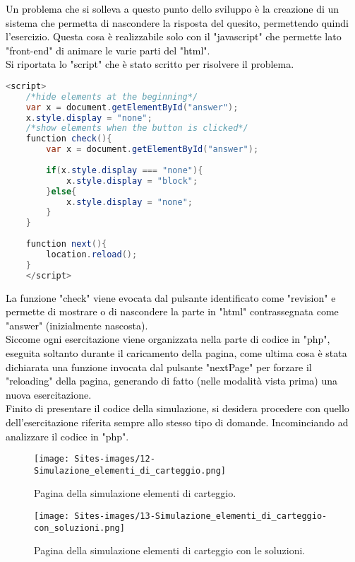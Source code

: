 \textcolor{black}{Un problema che si solleva a questo punto dello sviluppo è la creazione di un sistema che permetta di nascondere la risposta del quesito, permettendo quindi l'esercizio. Questa cosa è realizzabile solo con il "javascript" che permette lato "front-end" di animare le varie parti del "html".\\
Si riportata lo "script" che è stato scritto per risolvere il problema.}\\

\begin{lstlisting}[language=java]
	<script>
	/*hide elements at the beginning*/
	var x = document.getElementById("answer");
	x.style.display = "none";
	/*show elements when the button is clicked*/
	function check(){
		var x = document.getElementById("answer");
		
		if(x.style.display === "none"){
			x.style.display = "block";
		}else{
			x.style.display = "none";
		}	
	}
	
	function next(){
		location.reload();  
	}
	</script>
\end{lstlisting}

\textcolor{black}{La funzione "check" viene evocata dal pulsante identificato come "revision" e permette di mostrare o di nascondere la parte in "html" contrassegnata come "answer" (inizialmente nascosta).\\
Siccome ogni esercitazione viene organizzata nella parte di codice in "php", eseguita soltanto durante il caricamento della pagina, come ultima cosa è stata dichiarata una funzione invocata dal pulsante "nextPage" per forzare il "reloading" della pagina, generando di fatto (nelle modalità vista prima) una nuova esercitazione.}\\
\vspace*{2mm}
\textcolor{black}{Finito di presentare il codice della simulazione, si desidera procedere con quello dell'esercitazione riferita sempre allo stesso tipo di domande. Incominciando ad analizzare il codice in "php"}.


\begin{figure}[H]
	\begin{center}
		\texttt{[image: Sites-images/12-Simulazione\_elementi\_di\_carteggio.png]}
		\caption{Pagina della simulazione elementi di carteggio.}
	\end{center}
\end{figure}
\vspace*{-1cm}
\begin{figure}[H]
	\begin{center}
		\texttt{[image: Sites-images/13-Simulazione\_elementi\_di\_carteggio-con\_soluzioni.png]}
		\caption{Pagina della simulazione elementi di carteggio con le soluzioni.}
	\end{center}
\end{figure}

